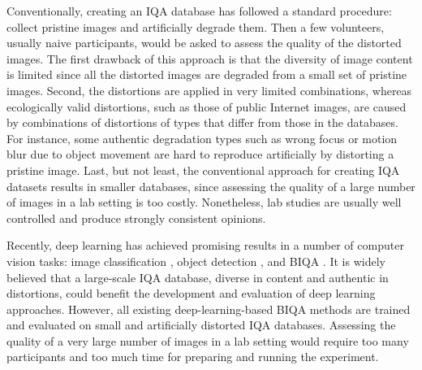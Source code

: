\documentclass[10pt,journal,compsoc]{IEEEtran}
\begin{document}
Conventionally, creating an IQA database has followed a standard procedure: collect pristine images and artificially degrade them. Then a few volunteers, usually naive participants, would be asked to assess the quality of the distorted images. The first drawback of this approach is that the diversity of image content is limited since all the distorted images are degraded from a small set of pristine images. Second, the distortions are applied in very limited combinations, whereas ecologically valid distortions, such as those of public Internet images, are caused by combinations of distortions of types that differ from those in the databases. For instance, some authentic degradation types such as wrong focus or motion blur due to object movement are hard to reproduce artificially by distorting a pristine image. Last, but not least, the conventional approach for creating IQA datasets results in smaller databases, since assessing the quality of a large number of images in a lab setting is too costly. Nonetheless, lab studies are usually well controlled and produce strongly consistent opinions.

Recently, deep learning has achieved promising results in a number of computer vision tasks: image classification \cite{vgg} \cite{he2016deep}, object detection \cite{ren2015faster} \cite{redmon2016you},  and BIQA \cite{boss} \cite{conv1} \cite{bianco2018use}. It is widely believed that a large-scale IQA database, diverse in content and authentic in distortions, could benefit the development and evaluation of deep learning approaches. However, all existing deep-learning-based BIQA methods are trained and evaluated on small and artificially distorted IQA databases. Assessing the quality of a very large number of images in a lab setting would require too many participants and too much time for preparing and running the experiment.
\end{document}
